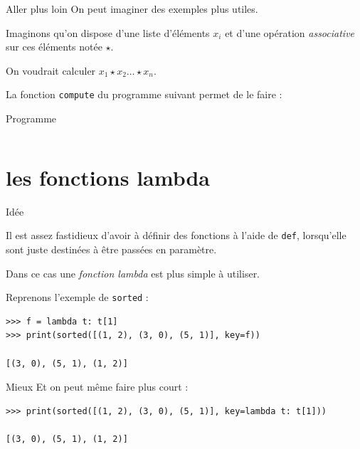 \documentclass[10pt]{beamer}
\begin{document}
\begin{frame}{Aller plus loin}
On peut imaginer des exemples plus utiles.\\\pause

Imaginons qu'on dispose d'une liste d'éléments $x_i$ et d'une opération \textit{associative} sur ces éléments notée $\star$.\\\pause

On voudrait calculer $x_1\star x_2\ldots\star x_n$.\\\pause

La fonction \texttt{compute} du programme suivant permet de le faire :
	
\end{frame}

\begin{frame}[fragile]{Programme}
\inputminted{python}{scripts/func2.py}	
\end{frame}


\section{les fonctions lambda}

\begin{frame}[fragile]{Idée}
	

Il est assez fastidieux d'avoir à définir des fonctions à l'aide de \texttt{def}, lorsqu'elle sont juste destinées à être passées en paramètre.\\\pause

Dans ce cas une \textit{fonction lambda} est plus simple à utiliser.\\\pause 

Reprenons l'exemple de \texttt{sorted} :\\\pause

\begin{verbatim}
>>> f = lambda t: t[1]
>>> print(sorted([(1, 2), (3, 0), (5, 1)], key=f))

[(3, 0), (5, 1), (1, 2)]
\end{verbatim}
\end{frame}

\begin{frame}[fragile]{Mieux}
Et on peut même faire plus court :
\begin{verbatim}
>>> print(sorted([(1, 2), (3, 0), (5, 1)], key=lambda t: t[1]))

[(3, 0), (5, 1), (1, 2)]
\end{verbatim}
\end{frame}
\end{document}
